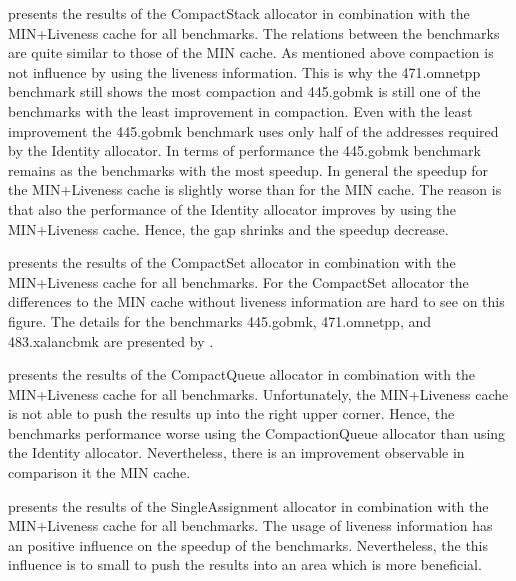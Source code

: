\documentclass[onecolumn, openright, master, english, signatures]{dbrgrptt}
\begin{document}
 presents the results of the CompactStack allocator in combination with the \ac{MIN}+Liveness cache for all benchmarks. The relations between the benchmarks are quite similar to those of the \ac{MIN} cache. As mentioned above compaction is not influence by using the liveness information. This is why the 471.omnetpp benchmark still shows the most compaction and 445.gobmk is still one of the benchmarks with the least improvement in compaction. Even with the least improvement the 445.gobmk benchmark uses only half of the addresses required by the Identity allocator. In terms of performance the 445.gobmk benchmark remains as the benchmarks with the most speedup. In general the speedup for the \ac{MIN}+Liveness cache is slightly worse than for the \ac{MIN} cache. The reason is that also the performance of the Identity allocator improves by using the \ac{MIN}+Liveness cache. Hence, the gap shrinks and the speedup decrease.

 presents the results of the CompactSet allocator in combination with the \ac{MIN}+Liveness cache for all benchmarks. For the CompactSet allocator the differences to the \ac{MIN} cache without liveness information are hard to see on this figure. The details for the benchmarks 445.gobmk, 471.omnetpp, and 483.xalancbmk are presented by .

 presents the results of the CompactQueue allocator in combination with the \ac{MIN}+Liveness cache for all benchmarks. Unfortunately, the \ac{MIN}+Liveness cache is not able to push the results up into the right upper corner. Hence, the benchmarks performance worse using the CompactionQueue allocator than using the Identity allocator. Nevertheless, there is an improvement observable in comparison it the \ac{MIN} cache.

 presents the results of the SingleAssignment allocator in combination with the \ac{MIN}+Liveness cache for all benchmarks. The usage of liveness information has an positive influence on the speedup of the benchmarks. Nevertheless, the this influence is to small to push the results into an area which is more beneficial.
\end{document}
